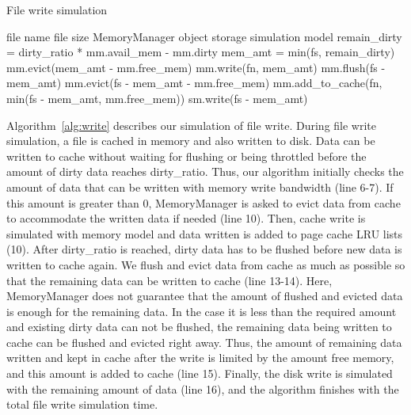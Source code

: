 \documentclass[conference]{IEEEtran}
\newcommand{\Desc}[2]{\State \makebox[2em][l]{#1}#2}
\begin{document}
			\begin{algorithm}\caption{File write simulation}\label{alg:write}
				\small
				\begin{algorithmic}[1]
					\Input
        				\Desc{fn}{file name}
        				\Desc{fs}{file size}
						\Desc{mm}{MemoryManager object}
						\Desc{sm}{storage simulation model}
   					\EndInput
					\State remain\_dirty = dirty\_ratio * mm.avail\_mem - mm.dirty
					\State mem\_amt = min(fs, remain\_dirty)
					 
    					\State mm.evict(mem\_amt - mm.free\_mem)
    					\State mm.write(fn, mem\_amt) 
    				\EndIf
					  
						\State mm.flush(fs - mem\_amt)  
						\State mm.evict(fs - mem\_amt  - mm.free\_mem) 
						\State mm.add\_to\_cache(fn, min(fs - mem\_amt, mm.free\_mem))
						\State sm.write(fs - mem\_amt)
					\EndIf
					
				\end{algorithmic}
			\end{algorithm}

			Algorithm~\ref{alg:write} describes our simulation of file write. 
			During file write simulation, a file is cached in memory and also written 
			to disk. Data can be written to cache without waiting for flushing or 
			being throttled before the amount of dirty data reaches dirty\_ratio. 
			Thus, our algorithm initially checks the amount of data that can be written 
			with memory write bandwidth (line 6-7).
			If this amount is greater than 0, MemoryManager is asked to evict 
			data from cache to accommodate the written data if needed (line 10). 
			Then, cache write is simulated with memory model and data written is 
			added to page cache LRU lists (10).
			After dirty\_ratio is reached, dirty data has to be flushed before new data 
			is written to cache again. 
			We flush and evict data from cache as much as possible so that the 
			remaining data can be written to cache (line 13-14). 
			Here, MemoryManager does not guarantee that the amount of flushed 
			and evicted data is enough for the remaining data. In the case it is 
			less than the required amount and existing dirty data can not be flushed, 
			the remaining data being written to cache can be flushed and evicted right away. 
			Thus, the amount of remaining data written and kept in cache 
			after the write is limited by the amount free memory, and this amount 
			is added to cache (line 15). 
			Finally, the disk write is simulated with the remaining amount of 
			data (line 16), and the algorithm finishes with the total file write simulation time.
			
\end{document}
